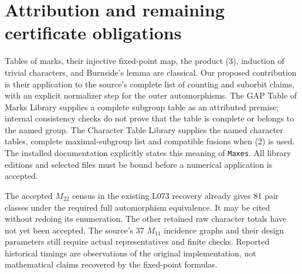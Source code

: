 \documentclass[11pt]{article}
\begin{document}
\section{Attribution and remaining certificate obligations}
Tables of marks, their injective fixed-point map, the product (3),
induction of trivial characters, and Burnside's lemma are classical.
Our proposed contribution is their application to the source's complete
list of counting and suborbit claims, with an explicit normalizer step
for the outer automorphisms. The GAP Table of Marks Library supplies a
complete subgroup table as an attributed premise; internal consistency
checks do not prove that the table is complete or belongs to the named
group. The Character Table Library supplies the named character tables,
complete maximal-subgroup list and compatible fusions when (2) is used.
The installed documentation explicitly states this meaning of
\texttt{Maxes}. All library editions and selected files must be bound
before a numerical application is accepted.

The accepted $M_{22}$ census in the existing L073 recovery already gives
81 pair classes under the required full automorphism equivalence. It
may be cited without redoing its enumeration. The other retained raw
character totals have not yet been accepted. The source's 37 $M_{11}$
incidence graphs and their design parameters still require actual
representatives and finite checks. Reported historical timings are
observations of the original implementation, not mathematical claims
recovered by the fixed-point formulas.
\end{document}
